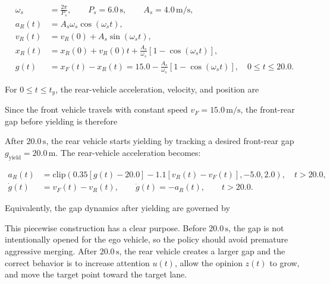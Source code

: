 {\small
\begin{equation}
\begin{aligned}
\omega_s&=\frac{2\pi}{P_s},\qquad P_s=6.0\,\mathrm{s},\qquad A_s=4.0\,\mathrm{m/s},\\
a_R(t)&=A_s\omega_s\cos(\omega_s t),\\
v_R(t)&=v_R(0)+A_s\sin(\omega_s t),\\
x_R(t)&=x_R(0)+v_R(0)t+\frac{A_s}{\omega_s}\left[1-\cos(\omega_s t)\right],\\
g(t)&=x_F(t)-x_R(t)=15.0-\frac{A_s}{\omega_s}\left[1-\cos(\omega_s t)\right],\quad 0\leq t\leq20.0.
\end{aligned}
\end{equation}
}





For \(0\leq t\leq t_y\), the rear-vehicle acceleration, velocity, and position are





Since the front vehicle travels with constant speed \(v_F=15.0\,\mathrm{m/s}\), the front-rear gap before yielding is therefore





After \(20.0\,\mathrm{s}\), the rear vehicle starts yielding by tracking a desired front-rear gap \(g_{\mathrm{yield}}=20.0\,\mathrm{m}\). The rear-vehicle acceleration becomes:



{\small
\begin{equation}
\begin{aligned}
a_R(t)&=\mathrm{clip}\left(0.35\left[g(t)-20.0\right]-1.1\left[v_R(t)-v_F(t)\right],-5.0,2.0\right),\quad t>20.0,\\
\dot{g}(t)&=v_F(t)-v_R(t),\qquad \ddot{g}(t)=-a_R(t),\qquad t>20.0.
\end{aligned}
\end{equation}
}





Equivalently, the gap dynamics after yielding are governed by





This piecewise construction has a clear purpose. Before \(20.0\,\mathrm{s}\), the gap is not intentionally opened for the ego vehicle, so the policy should avoid premature aggressive merging. After \(20.0\,\mathrm{s}\), the rear vehicle creates a larger gap and the correct behavior is to increase attention \(u(t)\), allow the opinion \(z(t)\) to grow, and move the target point toward the target lane.





